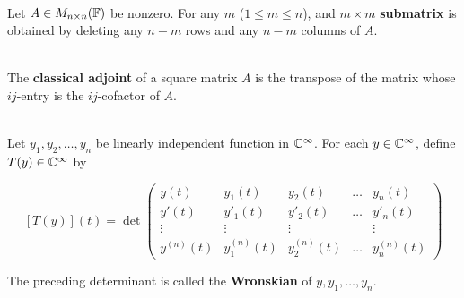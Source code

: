 \begin{definition}
	\hfill\\
	Let $A \in M_{n \times n}(\mathbb{F})$ be nonzero. For any $m$ ($1 \leq m \leq n$), and $m \times m$ \textbf{submatrix} is obtained by deleting any $n - m$ rows and any $n - m$ columns of $A$.
\end{definition}

\begin{definition}
	\hfill\\
	The \textbf{classical adjoint} of a square matrix $A$ is the transpose of the matrix whose $ij$-entry is the $ij$-cofactor of $A$.
\end{definition}

\begin{definition}
	\hfill\\
	Let $y_1, y_2, \dots, y_n$ be linearly independent function in $\mathbb{C}^\infty$. For each $y \in \mathbb{C}^\infty$, define $T(y) \in \mathbb{C}^\infty$ by
	
	\[[T(y)](t) = \det\begin{pmatrix}
		y(t) & y_1(t) & y_2(t) & \dots & y_n(t) \\
		y'(t) & y'_1(t) & y'_2(t) & \dots & y'_n(t) \\
		\vdots & \vdots & \vdots & &\vdots \\
		y^{(n)}(t) & y_1^{(n)}(t) & y_2^{(n)}(t) & \dots & y_n^{(n)}(t)
	\end{pmatrix}\]
	
	The preceding determinant is called the \textbf{Wronskian} of $y, y_1, \dots, y_n$.
\end{definition}